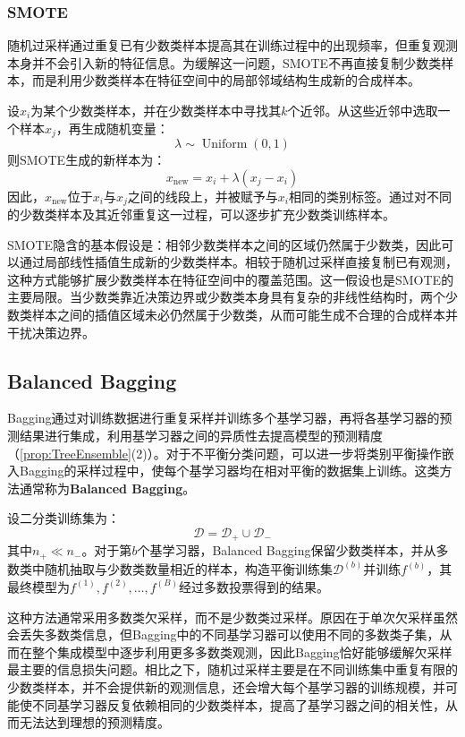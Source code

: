 \subsubsection{SMOTE}
随机过采样通过重复已有少数类样本提高其在训练过程中的出现频率，但重复观测本身并不会引入新的特征信息。为缓解这一问题，\gls{SMOTE}不再直接复制少数类样本，而是利用少数类样本在特征空间中的局部邻域结构生成新的合成样本。\par
设$x_i$为某个少数类样本，并在少数类样本中寻找其$k$个近邻。从这些近邻中选取一个样本$x_j$，再生成随机变量：
\begin{equation*}
	\lambda\sim\operatorname{Uniform}(0,1)
\end{equation*}
则SMOTE生成的新样本为：
\begin{equation*}
	x_{\mathrm{new}}=x_i+\lambda(x_j-x_i)
\end{equation*}
因此，$x_{\mathrm{new}}$位于$x_i$与$x_j$之间的线段上，并被赋予与$x_i$相同的类别标签。通过对不同的少数类样本及其近邻重复这一过程，可以逐步扩充少数类训练样本。\par
SMOTE隐含的基本假设是：相邻少数类样本之间的区域仍然属于少数类，因此可以通过局部线性插值生成新的少数类样本。相较于随机过采样直接复制已有观测，这种方式能够扩展少数类样本在特征空间中的覆盖范围。这一假设也是SMOTE的主要局限。当少数类靠近决策边界或少数类本身具有复杂的非线性结构时，两个少数类样本之间的插值区域未必仍然属于少数类，从而可能生成不合理的合成样本并干扰决策边界。

\subsection{Balanced Bagging}
Bagging通过对训练数据进行重复采样并训练多个基学习器，再将各基学习器的预测结果进行集成，利用基学习器之间的异质性去提高模型的预测精度（\cref{prop:TreeEnsemble}(2)）。对于不平衡分类问题，可以进一步将类别平衡操作嵌入Bagging的采样过程中，使每个基学习器均在相对平衡的数据集上训练。这类方法通常称为\textbf{Balanced Bagging}。\par
设二分类训练集为：
\begin{equation*}
	\mathcal{D}=\mathcal{D}_{+}\cup\mathcal{D}_{-}
\end{equation*}
其中$n_{+}\ll n_{-}$。对于第$b$个基学习器，Balanced Bagging保留少数类样本，并从多数类中随机抽取与少数类数量相近的样本，构造平衡训练集$\mathcal{D}^{(b)}$并训练$f^{(b)}$，其最终模型为$f^{(1)},f^{(2)},\dots,f^{(B)}$经过多数投票得到的结果。\par
这种方法通常采用多数类欠采样，而不是少数类过采样。原因在于单次欠采样虽然会丢失多数类信息，但Bagging中的不同基学习器可以使用不同的多数类子集，从而在整个集成模型中逐步利用更多多数类观测，因此Bagging恰好能够缓解欠采样最主要的信息损失问题。相比之下，随机过采样主要是在不同训练集中重复有限的少数类样本，并不会提供新的观测信息，还会增大每个基学习器的训练规模，并可能使不同基学习器反复依赖相同的少数类样本，提高了基学习器之间的相关性，从而无法达到理想的预测精度。

